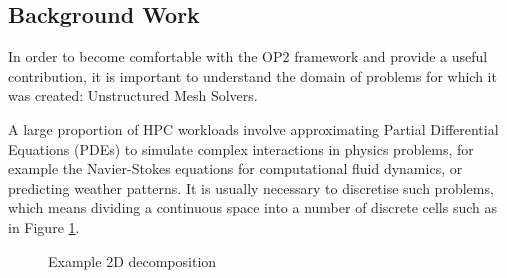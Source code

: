 \subsection{Background Work}
\label{s:bgwork}

In order to become comfortable with the OP2 framework and provide a useful contribution, it is important to understand the domain of problems for which it was created: Unstructured Mesh Solvers.
\par
A large proportion of HPC workloads involve approximating Partial Differential Equations (PDEs) to simulate complex interactions in physics problems, for example the Navier-Stokes equations for computational fluid dynamics, or predicting weather patterns. It is usually necessary to discretise such problems, which means dividing a continuous space into a number of discrete cells such as in Figure \ref{fig:2dmesh}.
\begin{figure}[h!]
  \begin{minipage}{.5\textwidth}
    \centering
  \end{minipage}
\begin{minipage}{.5\textwidth}
  \centering
  \end{minipage}
  \caption{Example 2D decomposition}
  \label{fig:2dmesh}
\end{figure}
